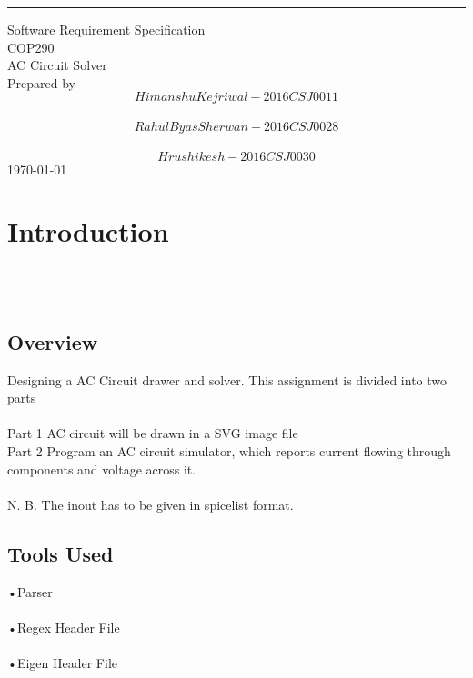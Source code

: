 \documentclass{scrreprt}
\date{}
\begin{document}
\begin{flushright}
    \rule{16cm}{5pt}\vskip1cm
    \begin{bfseries}
        \Huge{Software Requirement Specification}\\
        \vspace{1.9cm}
       COP290\\
        \vspace{1.9cm}
        \LARGE{AC Circuit Solver}\\
        \vspace{1.9cm}
        Prepared by \\ $$Himanshu Kejriwal - 2016CSJ0011$$\\ $$Rahul Byas Sherwan - 2016CSJ0028$$\\ $$Hrushikesh - 2016CSJ0030 $$
        \vspace{1.9cm}
        \today\\
    \end{bfseries}
\end{flushright}

\tableofcontents

\chapter{Introduction}
$ $
\\
\\
\\
$ $
\section{Overview}
$ $ \\
Designing a AC Circuit drawer and solver. This assignment is divided into two parts \\
\\
\indent Part 1 AC circuit will be drawn in a SVG image file\\
\indent Part 2 Program an AC circuit simulator, which reports current flowing through components and voltage across it.
\\
\\ N. B. The inout has to be given in spicelist format. $ $
\\
\section{Tools Used}
$ $
\\
\indent •Parser\\
\\
\indent •Regex Header File\\
\\
\indent •Eigen Header File\\
\\
$ $
\end{document}
